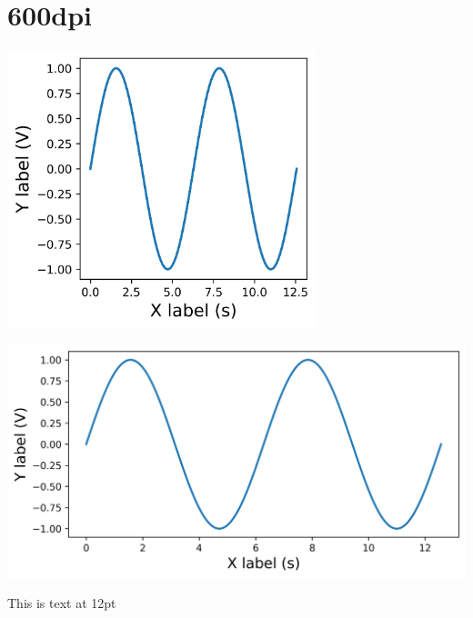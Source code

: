 \documentclass[12pt,a4paper]{article}
\begin{document}
\section*{600dpi}
\begin{center}
\includegraphics[width=3.54in]{600dpi.png}
\end{center}
\begin{center}
\includegraphics[width=7.25in]{600dpi-full.png}
\end{center}
This is text at 12pt
\end{document}
